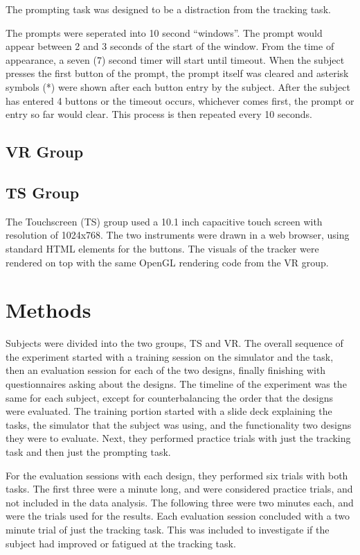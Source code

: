 The prompting task was designed to be a distraction from the tracking task.

The prompts were seperated into 10 second ``windows''.
The prompt would appear between 2 and 3 seconds of the start of the window.
From the time of appearance, a seven (7) second timer will start until timeout.
When the subject presses the first button of the prompt, the prompt itself was cleared and asterisk symbols (*) were shown after each button entry by the subject.
After the subject has entered 4 buttons or the timeout occurs, whichever comes first, the prompt or entry so far would clear.
This process is then repeated every 10 seconds.

\subsection{VR Group}

\subsection{TS Group}

The Touchscreen (TS) group used a 10.1 inch capacitive touch screen with resolution of 1024x768.
The two instruments were drawn in a web browser, using standard HTML elements for the buttons.
The visuals of the tracker were rendered on top with the same OpenGL rendering code from the VR group.


\section{Methods}

Subjects were divided into the two groups, TS and VR.
The overall sequence of the experiment started with a training session on the simulator and the task, then an evaluation session for each of the two designs, finally finishing with questionnaires asking about the designs.
The timeline of the experiment was the same for each subject, except for counterbalancing the order that the designs were evaluated.
The training portion started with a slide deck explaining the tasks, the simulator that the subject was using, and the functionality two designs they were to evaluate.
Next, they performed practice trials with just the tracking task and then just the prompting task.

For the evaluation sessions with each design, they performed six trials with both tasks.
The first three were a minute long, and were considered practice trials, and not included in the data analysis.
The following three were two minutes each, and were the trials used for the results.
Each evaluation session concluded with a two minute trial of just the tracking task.
This was included to investigate if the subject had improved or fatigued at the tracking task.

